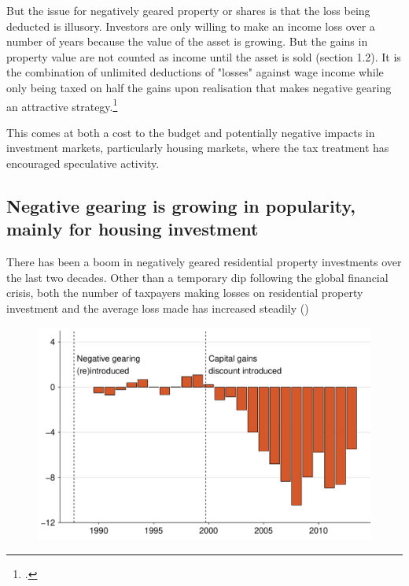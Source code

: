 \documentclass{grattan}\usepackage[]{graphicx}\usepackage[]{color}
\begin{document}
But the issue for negatively geared property or shares is that the loss being deducted is illusory. Investors are only willing to make an income loss over a number of years because the value of the asset is growing. But the gains in property value are not counted as income until the asset is sold (section 1.2). It is the combination of unlimited deductions of "losses" against wage income while only being taxed on half the gains upon realisation that makes negative gearing an attractive strategy.\footcite[pages~5,13]{ACOSS} 

This comes at both a cost to the budget and potentially negative impacts in investment markets, particularly housing markets, where the tax treatment has encouraged speculative activity. 

\subsection{Negative gearing is growing in popularity, mainly for housing investment}
There has been a boom in negatively geared residential property investments over the last two decades. Other than a temporary dip following the global financial crisis, both the number of taxpayers making losses on residential property investment and the average loss made has increased steadily ()




\begin{figure}[t]
\includegraphics[width=\columnwidth]{figure/Net_rent_over_time-1}

\end{figure}
\end{document}

